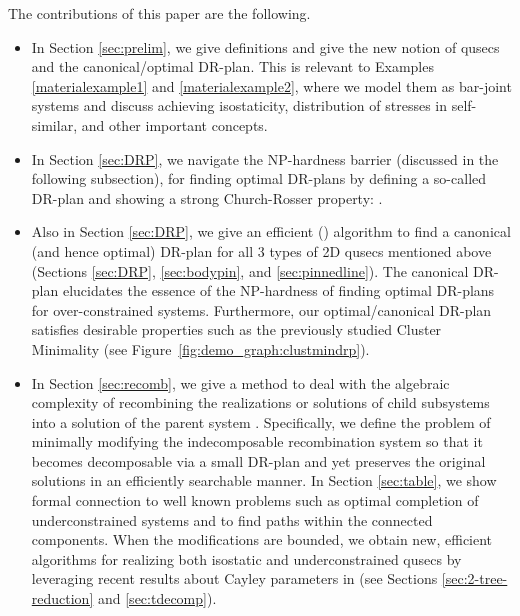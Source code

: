The contributions of this paper are the following.
\begin{itemize}
  \item In Section \ref{sec:prelim}, we give definitions and give the new notion of qusecs and the canonical/optimal DR-plan. This is relevant to Examples \ref{materialexample1} and \ref{materialexample2}, where we model them as bar-joint systems and discuss achieving isostaticity, distribution of stresses in self-similar, and other important concepts.

  \item In Section \ref{sec:DRP}, we navigate the NP-hardness barrier (discussed in the following subsection), for finding optimal DR-plans by defining a so-called  DR-plan and showing a strong Church-Rosser property: .

  \item Also in Section \ref{sec:DRP}, we give an efficient (\candrpcomplexity) algorithm to find a canonical (and hence optimal) DR-plan for all 3 types of 2D qusecs mentioned above (Sections \ref{sec:DRP}, \ref{sec:bodypin}, and \ref{sec:pinnedline}). The canonical DR-plan elucidates the essence of the NP-hardness of finding optimal DR-plans for over-constrained systems. Furthermore, our optimal/canonical DR-plan satisfies desirable properties such as the previously studied Cluster Minimality \cite{hoffman2001decompositionI} (see Figure~\ref{fig:demo_graph:clustmindrp}).

  \item In Section \ref{sec:recomb}, we give a method to deal with the algebraic complexity of recombining the realizations or solutions of child subsystems into a solution of the parent system \cite{sitharam2010optimized,sitharam2006well,sitharam2010reconciling}. Specifically, we define the problem of minimally modifying the indecomposable recombination system so that it becomes decomposable via a small DR-plan and yet preserves the original solutions in an efficiently searchable manner. In Section \ref{sec:table}, we show formal connection to well known problems such as optimal completion of underconstrained systems \cite{joan-arinyo2003transforming,sitharam2005combinatorial,gao2006ctree} and to find paths within the connected components. When the modifications are bounded, we obtain new, efficient algorithms for realizing both isostatic and underconstrained qusecs by leveraging recent results about Cayley parameters in \cite{sitharam2010convex,sitharam2011cayleyI,sitharam2011cayleyII} (see Sections \ref{sec:2-tree-reduction} and \ref{sec:tdecomp}).


\end{itemize}

